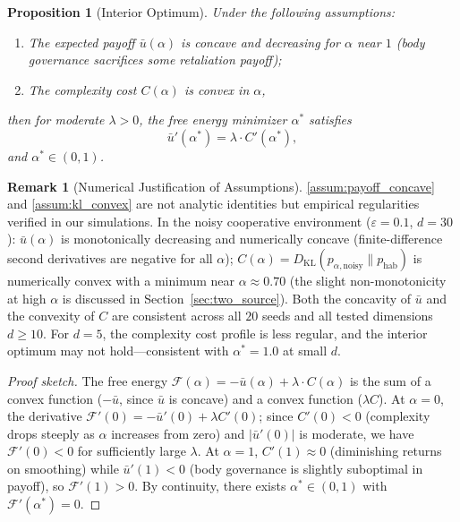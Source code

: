 \documentclass[11pt,a4paper]{article}
\newtheorem{proposition}[theorem]{Proposition}
\theoremstyle{definition}
\newtheorem{remark}[theorem]{Remark}
\newcommand{\KL}{D_{\mathrm{KL}}}
\newcommand{\FE}{\mathcal{F}}
\begin{document}
\begin{proposition}[Interior Optimum]
\label{prop:interior_optimum}
Under the following assumptions:
\begin{enumerate}[label=(A\arabic*),nosep]
  \item \label{assum:payoff_concave} The expected payoff $\bar{u}(\alpha)$ is concave and
    decreasing for $\alpha$ near $1$ (body governance sacrifices some
    retaliation payoff);
  \item \label{assum:kl_convex} The complexity cost $C(\alpha)$ is convex in
    $\alpha$,
\end{enumerate}
then for moderate $\lambda > 0$,
the free energy minimizer $\alpha^{*}$ satisfies
\begin{equation}
\label{eq:optimal_alpha}
\bar{u}'(\alpha^{*}) = \lambda \cdot C'(\alpha^{*}),
\end{equation}
and $\alpha^{*} \in (0,1)$.
\end{proposition}

\begin{remark}[Numerical Justification of Assumptions]
\ref{assum:payoff_concave} and \ref{assum:kl_convex} are not analytic
identities but empirical regularities verified in our simulations.
In the noisy cooperative environment ($\varepsilon = 0.1$, $d = 30$):
$\bar{u}(\alpha)$ is monotonically decreasing and numerically concave
(finite-difference second derivatives are negative for all $\alpha$);
$C(\alpha) = \KL(p_{\alpha,\mathrm{noisy}} \| p_{\mathrm{hab}})$ is
numerically convex with a minimum near $\alpha \approx 0.70$ (the slight
non-monotonicity at high $\alpha$ is discussed in
Section~\ref{sec:two_source}).  Both the concavity of $\bar{u}$ and
the convexity of $C$ are consistent across all $20$ seeds and all
tested dimensions $d \geq 10$.
For $d = 5$, the complexity cost profile is less regular, and the interior
optimum may not hold---consistent with $\alpha^{*} = 1.0$ at small $d$.
\end{remark}

\begin{proof}[Proof sketch]
The free energy $\FE(\alpha) = -\bar{u}(\alpha) + \lambda \cdot C(\alpha)$
is the sum of a convex function ($-\bar{u}$, since $\bar{u}$ is concave)
and a convex function ($\lambda C$).  At $\alpha = 0$, the derivative
$\FE'(0) = -\bar{u}'(0) + \lambda C'(0)$; since $C'(0) < 0$ (complexity
drops steeply as $\alpha$ increases from zero) and $|\bar{u}'(0)|$ is
moderate, we have $\FE'(0) < 0$ for sufficiently large $\lambda$.
At $\alpha = 1$, $C'(1) \approx 0$ (diminishing returns on smoothing)
while $\bar{u}'(1) < 0$ (body governance is slightly suboptimal in payoff),
so $\FE'(1) > 0$.  By continuity, there exists $\alpha^{*} \in (0,1)$
with $\FE'(\alpha^{*}) = 0$.
\end{proof}
\end{document}
